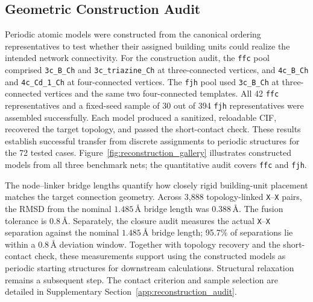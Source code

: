 \documentclass[a5paper, 10pt]{article}
\begin{document}
\subsection{Geometric Construction Audit}
\label{sec:reconstruction}

Periodic atomic models were constructed from the canonical ordering representatives to test whether their assigned building units could realize the intended network connectivity. For the construction audit, the \texttt{ffc} pool comprised \texttt{3c\_B\_Ch} and \texttt{3c\_triazine\_Ch} at three-connected vertices, and \texttt{4c\_B\_Ch} and \texttt{4c\_Cd\_1\_Ch} at four-connected vertices. The \texttt{fjh} pool used \texttt{3c\_B\_Ch} at three-connected vertices and the same two four-connected templates. All 42 \texttt{ffc} representatives and a fixed-seed sample of 30 out of 394 \texttt{fjh} representatives were assembled successfully. Each model produced a sanitized, reloadable CIF, recovered the target topology, and passed the short-contact check. These results establish successful transfer from discrete assignments to periodic structures for the 72 tested cases. Figure~\ref{fig:reconstruction_gallery} illustrates constructed models from all three benchmark nets; the quantitative audit covers \texttt{ffc} and \texttt{fjh}.

The node--linker bridge lengths quantify how closely rigid building-unit placement matches the target connection geometry. Across 3,888 topology-linked \texttt{X}--\texttt{X} pairs, the RMSD from the nominal $1.485$\,\AA{} bridge length was 0.388\,\AA{}. The fusion tolerance is 0.8\,\AA{}. Separately, the closure audit measures the actual \texttt{X}--\texttt{X} separation against the nominal $1.485$\,\AA{} bridge length; 95.7\% of separations lie within a 0.8\,\AA{} deviation window. Together with topology recovery and the short-contact check, these measurements support using the constructed models as periodic starting structures for downstream calculations. Structural relaxation remains a subsequent step. The contact criterion and sample selection are detailed in Supplementary Section~\ref{app:reconstruction_audit}.
\end{document}
